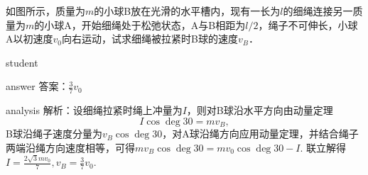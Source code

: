  \begin{example}
 	 如图所示，质量为$ m $的小球B放在光滑的水平槽内，现有一长为$ l $的细绳连接另一质量为$ m $的小球A，开始细绳处于松弛状态，A与B相距为$ l/2 $，绳子不可伸长，小球A以初速度$ v_0 $向右运动，试求细绳被拉紧时B球的速度$ v_B $．
 	
 	\begin{taggedblock}{student}
 		\vspace*{2cm}
 	\end{taggedblock}
 	
 	
 	\begin{taggedblock}{answer}
 		答案：$ \frac{3}{7}v_0 $
 	\end{taggedblock}
 	
 	
 	\begin{taggedblock}{analysis}
 		解析：设细绳拉紧时绳上冲量为$ I $，则对B球沿水平方向由动量定理
 		\[
 		I\cos\deg{30} = mv_B,
 		\]
 		B球沿绳子速度分量为$v_B\cos\deg{30}$，对A球沿绳方向应用动量定理，并结合绳子两端沿绳方向速度相等，可得$mv_B\cos\deg{30} = mv_0\cos\deg{30}-I$.
 		联立解得  $ I = \frac{2\sqrt{3}mv_0}{7} ,v_B = \frac{3}{7}v_0$.
 	\end{taggedblock}
 \end{example}
 
